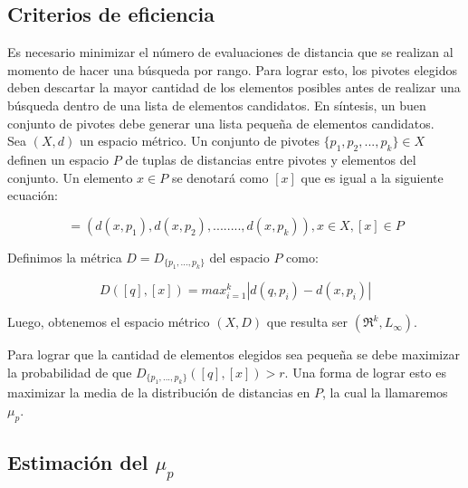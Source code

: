 \subsection{Criterios de eficiencia}

Es necesario minimizar el n\'umero de evaluaciones de distancia que se realizan al momento de hacer una b\'usqueda por rango. Para lograr esto, los pivotes elegidos deben descartar la mayor cantidad de los elementos posibles antes de realizar una b\'usqueda dentro de una lista de elementos candidatos. En s\'intesis, un buen conjunto de pivotes debe generar una lista peque\~na de elementos candidatos.\\

Sea $(X,d)$ un espacio m\'etrico. Un conjunto de pivotes $\{p_1,p_2,...,p_k\} \in X$ definen un espacio $P$ de tuplas de distancias entre pivotes y elementos del conjunto. Un elemento $x \in P$ se denotar\'a como $[x]$ que es igual a la siguiente ecuaci\'on:

\begin{equation}
[x] = (d(x,p_1),d(x,p_2),........,d(x,p_k)), x \in X, [x] \in P
\label{eq-mapeo}
\end{equation}

\noindent Definimos la m\'etrica $D = D_{\{p_1,...,p_k\}}$ del espacio $P$ como:

\begin{equation}
D([q],[x]) = max_{i=1}^k |d(q,p_i) - d(x,p_i)|
\label{eq-met-esp}
\end{equation}

Luego, obtenemos el espacio m\'etrico $(X,D)$ que resulta ser $(\Re^k, L_{\infty})$. 


Para lograr que la cantidad de elementos elegidos sea peque\~na se debe maximizar la probabilidad de que $D_{\{p_1,...,p_k\}}([q],[x]) > r$. Una forma de lograr esto es maximizar la media de la distribuci\'on de distancias en $P$, la cual la llamaremos $\mu_p$.
 
\subsection{Estimaci\'on del $\mu_p$}

